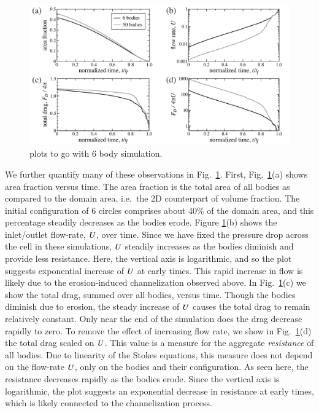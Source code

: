 \documentclass[preprint, 10pt]{elsarticle}
\begin{document}
\begin{figure}%
\begin{center}
\includegraphics[width = 0.95 \textwidth]{./figs/mbodyplots.pdf}
\caption{\label{fig:mbodyplots} plots to go with 6 body simulation.
}
\end{center}
\end{figure}

We further quantify many of these observations in Fig.~\ref{fig:mbodyplots}. First, Fig.~\ref{fig:mbodyplots}(a) shows area fraction versus time. The area fraction is the total area of all bodies as compared to the domain area, i.e.~the 2D counterpart of volume fraction. The initial configuration of 6 circles comprises about 40\% of the domain area, and this percentage steadily decreases as the bodies erode. Figure \ref{fig:mbodyplots}(b) shows the inlet/outlet flow-rate, $U$, over time. Since we have fixed the pressure drop across the cell in these simulations, $U$ steadily increases as the bodies diminish and provide less resistance. Here, the vertical axis is logarithmic, and so the plot suggests exponential increase of $U$ at early times. This rapid increase in flow is likely due to the erosion-induced channelization observed above. In Fig.~\ref{fig:mbodyplots}(c) we show the total drag, summed over all bodies, versus time. Though the bodies diminish due to erosion, the steady increase of $U$ causes the total drag to remain relatively constant. Only near the end of the simulation does the drag decrease rapidly to zero. To remove the effect of increasing flow rate, we show in Fig.~\ref{fig:mbodyplots}(d) the total drag scaled on $U$. This value is a measure for the aggregate {\em resistance} of all bodies. Due to linearity of the Stokes equations, this measure does not depend on the flow-rate $U$, only on the bodies and their configuration. As seen here, the resistance decreases rapidly as the bodies erode. Since the vertical axis is logarithmic, the plot suggests an exponential decrease in resistance at early times, which is likely connected to the channelization process.
\end{document}
